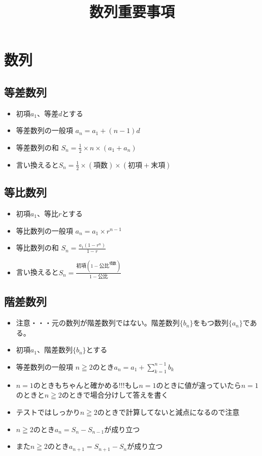 \documentclass[twocolumn, 25pt]{jarticle}
\title{数列重要事項}
\begin{document}
\columnseprule=0.2mm
\date{}
\maketitle
\vspace{-2cm}
\section{数列}
\subsection{等差数列}
\begin{itemize}
  \item 初項$a_1$、等差$d$とする
  \item 等差数列の一般項  $\displaystyle a_n = a_1 + (n - 1)d$
  \item 等差数列の和 $\displaystyle S_n = \frac{1}{2} \times n \times (a_1 + a_n)$
  \item 言い換えると$\displaystyle S_n = \frac{1}{2} \times (項数) \times (初項 + 末項)$
\end{itemize}
\subsection{等比数列}
\begin{itemize}
  \item 初項$a_1$、等比$r$とする
  \item 等比数列の一般項  $\displaystyle a_n = a_1 \times r^{n - 1}$
  \item 等比数列の和 $\displaystyle S_n = \frac{a_1 (1 - r^n)}{1 - r}$
  \item 言い換えると$\displaystyle S_n = \frac{初項 (1 - 公比^{項数})}{1 - 公比}$
\end{itemize}
\subsection{階差数列}
\begin{itemize}
  \item 注意・・・元の数列が階差数列ではない。階差数列$\{b_n\}$をもつ数列$\{a_n\}$である。
  \item 初項$a_1$、階差数列$\{b_n\}$とする
  \item 等差数列の一般項  $\displaystyle n \geqq 2 のとき a_n = a_1 + \sum_{k = 1}^{n - 1} b_k$
  \item {\LARGE$n = 1$のときもちゃんと確かめる!!!もし$n = 1$のときに値が違っていたら$n = 1$のときと$n \geqq 2$のときで場合分けして答えを書く}
  \item テストではしっかり$n \geqq 2$のときで計算してないと減点になるので注意
  \item $n \geqq 2$のとき$a_n = S_n - S_{n - 1}$が成り立つ
  \item また$n \geqq 2$のとき$a_{n + 1} = S_{n + 1} - S_{n}$が成り立つ
\end{itemize}
\end{document}
